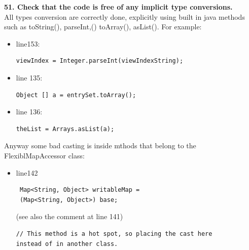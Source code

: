 \documentclass{article}
\begin{document}
\begin{flushleft}
\textbf{51. Check that the code is free of any implicit type conversions.}\\
\vspace{0.5cm}
All types conversion are correctly done, explicitly using built in java methods such as toString(), parseInt,() toArray(), asList(). For example:\\
\vspace{0.5cm}
\begin{itemize}
\item line153: \\
\vspace{0.5cm}
\begin{lstlisting}
viewIndex = Integer.parseInt(viewIndexString);
\end{lstlisting}
\vspace{0.5cm}
\item line 135: \\
\vspace{0.5cm}
\begin{lstlisting}
Object [] a = entrySet.toArray();    
\end{lstlisting}     
\vspace{0.5cm}                              
\item line 136: \\
\vspace{0.5cm}
\begin{lstlisting}
theList = Arrays.asList(a);
\end{lstlisting}
\end{itemize}
\vspace{0.5cm}
Anyway some bad casting is inside mthods that belong to the  FlexiblMapAccessor class:\\
\vspace{0.5cm}
\begin{itemize}
\item line142\\
\vspace{0.5cm}
\begin{lstlisting}
 Map<String, Object> writableMap = 
 (Map<String, Object>) base;
 \end{lstlisting}
 \vspace{0.5cm}
(see also the comment at line 141)\\
\vspace{0.5cm}
\begin{lstlisting}
// This method is a hot spot, so placing the cast here 
instead of in another class.
\end{lstlisting}
\vspace{0.5cm}
\end{itemize}




\end{flushleft}
\end{document}
